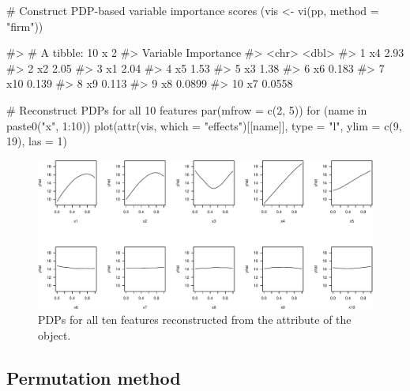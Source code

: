 \begin{Schunk}
\begin{Sinput}
# Construct PDP-based variable importance scores
(vis <- vi(pp, method = "firm"))
\end{Sinput}
\begin{Soutput}
#> # A tibble: 10 x 2
#>    Variable Importance
#>    <chr>         <dbl>
#>  1 x4           2.93  
#>  2 x2           2.05  
#>  3 x1           2.04  
#>  4 x5           1.53  
#>  5 x3           1.38  
#>  6 x6           0.183 
#>  7 x10          0.139 
#>  8 x9           0.113 
#>  9 x8           0.0899
#> 10 x7           0.0558
\end{Soutput}
\begin{Sinput}
# Reconstruct PDPs for all 10 features
par(mfrow = c(2, 5))
for (name in paste0("x", 1:10)) {
  plot(attr(vis, which = "effects")[[name]], type = "l", ylim = c(9, 19), las = 1)
}
\end{Sinput}
\begin{figure}[!htb]

{\centering \includegraphics[width=1\linewidth]{greenwell-boehmke_files/figure-latex/pdp-from-attr-1} 

}

\caption[PDPs for all ten features reconstructed from the  attribute of the  object]{PDPs for all ten features reconstructed from the  attribute of the  object.}\label{fig:pdp-from-attr}
\end{figure}
\end{Schunk}

\subsection{Permutation method}

